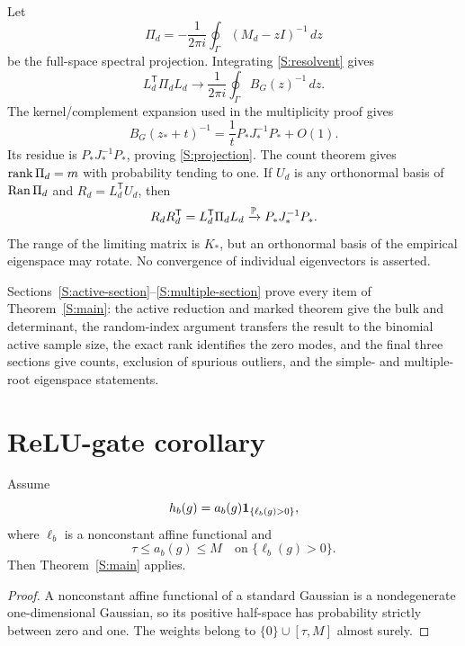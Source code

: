 Let
\begin{equation}
\Pi_d=-\frac1{2\pi i}\oint_\Gamma(M_d-zI)^{-1}\,dz
\end{equation}
be the full-space spectral projection. Integrating
\eqref{S:resolvent} gives
\begin{equation}
L_d^{\mathsf T}\Pi_dL_d
\longrightarrow
\frac1{2\pi i}\oint_\Gamma B_G(z)^{-1}\,dz.
\label{S:projection-contour}
\end{equation}
The kernel/complement expansion used in the multiplicity proof gives
\begin{equation}
B_G(z_*+t)^{-1}
=
\frac1tP_*J_*^{-1}P_*+O(1).
\end{equation}
Its residue is $P_*J_*^{-1}P_*$, proving \eqref{S:projection}. The count
theorem gives $\operatorname{rank}\Pi_d=m$ with probability tending to one. If $U_d$ is
any orthonormal basis of $\operatorname{Ran}\Pi_d$ and $R_d=L_d^{\mathsf T}U_d$, then
\begin{equation}
R_dR_d^{\mathsf T}
=L_d^{\mathsf T}\Pi_dL_d
\xrightarrow{\mathbb{P}}P_*J_*^{-1}P_*.
\end{equation}
The range of the limiting matrix is $K_*$, but an orthonormal basis of the
empirical eigenspace may rotate. No convergence of individual
eigenvectors is asserted.

Sections~\ref*{S:active-section}--\ref*{S:multiple-section} prove every item
of Theorem~\ref{S:main}: the active reduction and marked theorem give the
bulk and determinant, the random-index argument transfers the result to the
binomial active sample size, the exact rank identifies the zero modes, and
the final three sections give counts, exclusion of spurious outliers, and
the simple- and multiple-root eigenspace statements.

\section{ReLU-gate corollary}

\begin{corollary}
Assume
\begin{equation}
h_b(g)=a_b(g)\mathbf{1}_{\{\ell_b(g)>0\}},
\end{equation}
where $\ell_b$ is a nonconstant affine functional and
\begin{equation}
\tau\le a_b(g)\le M
\quad\text{on }\{\ell_b(g)>0\}.
\end{equation}
Then Theorem~\ref{S:main} applies.
\end{corollary}

\begin{proof}
A nonconstant affine functional of a standard Gaussian is a nondegenerate one-dimensional Gaussian, so its positive half-space has probability strictly between zero and one. The weights belong to $\{0\}\cup[\tau,M]$ almost surely.
\end{proof}

